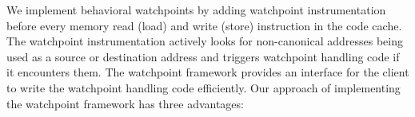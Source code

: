 %
%
We implement behavioral watchpoints by adding watchpoint instrumentation before every memory read (load) and write (store) instruction in the code cache. The watchpoint instrumentation actively looks for non-canonical addresses being used as a source or destination address and triggers watchpoint handling code if it encounters them. The watchpoint framework provides an interface for the client to write the watchpoint handling code efficiently. Our approach of implementing the watchpoint framework has three advantages: %

